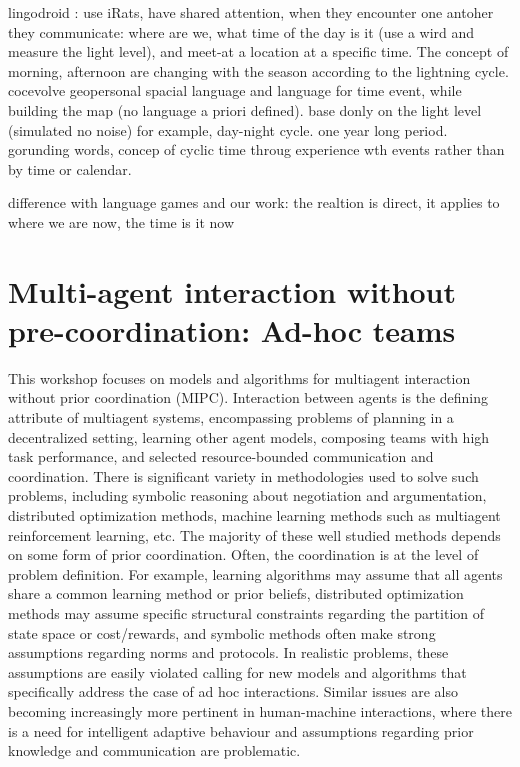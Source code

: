 lingodroid \cite{schulz2010robots} : use iRats, have shared attention, when they encounter one antoher they communicate: where are we, what time of the day is it (use a wird and measure the light level), and meet-at a location at a specific time. The concept of morning, afternoon are changing with the season according to the lightning cycle. \cite{schulz2011lingodroids}
\cite{heath2012long} cocevolve geopersonal spacial language and language for time event, while building the map (no language a priori defined). base donly on the light level (simulated no noise) for example, day-night cycle. one year long period. gorunding words, concep of cyclic time throug experience wth events rather than by time or calendar.


difference with language games and our work: the realtion is direct, it applies to where we are now, the time is it now

\section{Multi-agent interaction without pre-coordination: Ad-hoc teams}

This workshop focuses on models and algorithms for multiagent interaction without prior coordination (MIPC). Interaction between agents is the defining attribute of multiagent systems, encompassing problems of planning in a decentralized setting, learning other agent models, composing teams with high task performance, and selected resource-bounded communication and coordination. There is significant variety in methodologies used to solve such problems, including symbolic reasoning about negotiation and argumentation, distributed optimization methods, machine learning methods such as multiagent reinforcement learning, etc. The majority of these well studied methods depends on some form of prior coordination. Often, the coordination is at the level of problem definition. For example, learning algorithms may assume that all agents share a common learning method or prior beliefs, distributed optimization methods may assume specific structural constraints regarding the partition of state space or cost/rewards, and symbolic methods often make strong assumptions regarding norms and protocols. In realistic problems, these assumptions are easily violated calling for new models and algorithms that specifically address the case of ad hoc interactions. Similar issues are also becoming increasingly more pertinent in human-machine interactions, where there is a need for intelligent adaptive behaviour and assumptions regarding prior knowledge and communication are problematic.

